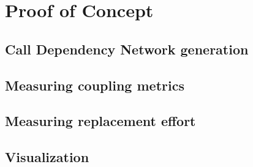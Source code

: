 \chapter{Proof of Concept}\label{ch:PoC}

\section{Call Dependency Network generation}


\section{Measuring coupling metrics}

\section{Measuring replacement effort}

\section{Visualization}
